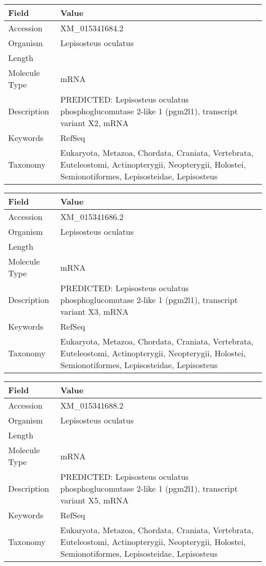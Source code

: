 \documentclass[10pt]{article}
\begin{document}
{\footnotesize
\begin{longtable}{>{\raggedright\arraybackslash}p{4.5cm} >{\raggedright\arraybackslash}p{11.5cm}}
\textbf{Field} & \textbf{Value} \\
\hline
Accession & XM\_015341684.2 \\
Organism & Lepisosteus oculatus \\
Length & 7190 \\
Molecule Type & mRNA \\
Description & PREDICTED: Lepisosteus oculatus phosphoglucomutase 2-like 1 (pgm2l1), transcript variant X2, mRNA \\
Keywords & RefSeq \\
Taxonomy & Eukaryota, Metazoa, Chordata, Craniata, Vertebrata, Euteleostomi, Actinopterygii, Neopterygii, Holostei, Semionotiformes, Lepisosteidae, Lepisosteus \\
\end{longtable}
}

{\footnotesize
\begin{longtable}{>{\raggedright\arraybackslash}p{4.5cm} >{\raggedright\arraybackslash}p{11.5cm}}
\textbf{Field} & \textbf{Value} \\
\hline
Accession & XM\_015341686.2 \\
Organism & Lepisosteus oculatus \\
Length & 7094 \\
Molecule Type & mRNA \\
Description & PREDICTED: Lepisosteus oculatus phosphoglucomutase 2-like 1 (pgm2l1), transcript variant X3, mRNA \\
Keywords & RefSeq \\
Taxonomy & Eukaryota, Metazoa, Chordata, Craniata, Vertebrata, Euteleostomi, Actinopterygii, Neopterygii, Holostei, Semionotiformes, Lepisosteidae, Lepisosteus \\
\end{longtable}
}

{\footnotesize
\begin{longtable}{>{\raggedright\arraybackslash}p{4.5cm} >{\raggedright\arraybackslash}p{11.5cm}}
\textbf{Field} & \textbf{Value} \\
\hline
Accession & XM\_015341688.2 \\
Organism & Lepisosteus oculatus \\
Length & 6984 \\
Molecule Type & mRNA \\
Description & PREDICTED: Lepisosteus oculatus phosphoglucomutase 2-like 1 (pgm2l1), transcript variant X5, mRNA \\
Keywords & RefSeq \\
Taxonomy & Eukaryota, Metazoa, Chordata, Craniata, Vertebrata, Euteleostomi, Actinopterygii, Neopterygii, Holostei, Semionotiformes, Lepisosteidae, Lepisosteus \\
\end{longtable}
}
\end{document}
